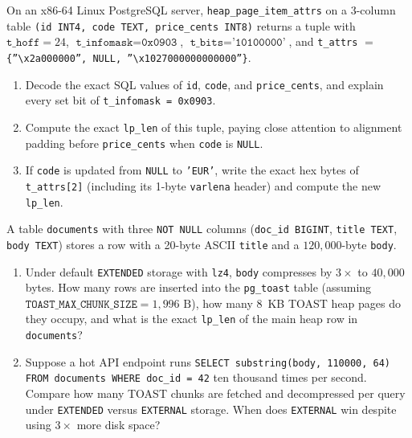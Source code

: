 \begin{exercise}
\label{ex:ch02-hex-decode}
On an x86-64 Linux PostgreSQL server, \texttt{heap\_page\_item\_attrs} on a 3-column table \texttt{(id INT4, code TEXT, price\_cents INT8)} returns a tuple with $\texttt{t\_hoff} = 24$, $\texttt{t\_infomask} = \texttt{0x0903}$, $\texttt{t\_bits} = \texttt{'10100000'}$, and \texttt{t\_attrs} $=$ \texttt{\{''\textbackslash{}x2a000000'', NULL, ''\textbackslash{}x1027000000000000''\}}.
\begin{enumerate}[label=(\alph*)]
  \item Decode the exact SQL values of \texttt{id}, \texttt{code}, and \texttt{price\_cents}, and explain every set bit of \texttt{t\_infomask = 0x0903}.
  \item Compute the exact \texttt{lp\_len} of this tuple, paying close attention to alignment padding before \texttt{price\_cents} when \texttt{code} is \texttt{NULL}.
  \item If \texttt{code} is updated from \texttt{NULL} to \texttt{'EUR'}, write the exact hex bytes of \texttt{t\_attrs[2]} (including its 1-byte \texttt{varlena} header) and compute the new \texttt{lp\_len}.
\end{enumerate}
\end{exercise}

\begin{exercise}
\label{ex:ch02-toast-math}
A table \texttt{documents} with three \texttt{NOT NULL} columns (\texttt{doc\_id BIGINT}, \texttt{title TEXT}, \texttt{body TEXT}) stores a row with a 20-byte ASCII \texttt{title} and a $120{,}000$-byte \texttt{body}.
\begin{enumerate}[label=(\alph*)]
  \item Under default \texttt{EXTENDED} storage with \texttt{lz4}, \texttt{body} compresses by $3\times$ to $40{,}000$ bytes. How many rows are inserted into the \texttt{pg\_toast} table (assuming $\texttt{TOAST\_MAX\_CHUNK\_SIZE} = 1{,}996\text{ B}$), how many 8~KB TOAST heap pages do they occupy, and what is the exact \texttt{lp\_len} of the main heap row in \texttt{documents}?
  \item Suppose a hot API endpoint runs \texttt{SELECT substring(body, 110000, 64) FROM documents WHERE doc\_id = 42} ten thousand times per second. Compare how many TOAST chunks are fetched and decompressed per query under \texttt{EXTENDED} versus \texttt{EXTERNAL} storage. When does \texttt{EXTERNAL} win despite using $3\times$ more disk space?
\end{enumerate}
\end{exercise}


